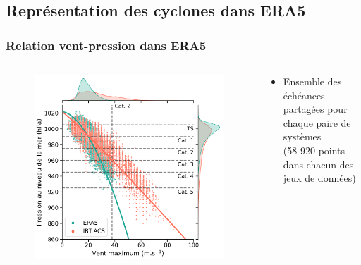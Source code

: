 \documentclass[aspectratio=169, usepdftitle=false, xcolor={dvipsnames}, 9pt,table]{beamer}
\begin{document}
\subsection[Représentation des cyclones dans ERA5]{Représentation des cyclones dans ERA5}
\begin{frame}
    \frametitle{Relation vent-pression dans ERA5}
    \begin{columns}
        \begin{column}{0.5\textwidth}
            \begin{figure}
                \centering
                \includegraphics[width=\textwidth]{Figures/ERA5_PV_myVTU.png}
            \end{figure}
        \end{column}
        \begin{column}{0.5\textwidth}
            \footnotesize
            \setlength{\leftmargini}{3.5ex}
            \vspace{1.25ex}
            \begin{examples}[Méthodologie] 
                \begin{itemize}
                    \item Ensemble des échéances partagées pour chaque paire de systèmes\\(58 920 points dans chacun des jeux de données)

\end{itemize}
\end{examples}
\end{column}
\end{columns}
\end{frame}
\end{document}
